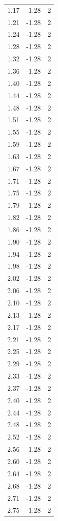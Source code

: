 \begin{longtable}{lrr}
  1.17 & -1.28 & 2 \\
  1.21 & -1.28 & 2 \\
  1.24 & -1.28 & 2 \\
  1.28 & -1.28 & 2 \\
  1.32 & -1.28 & 2 \\
  1.36 & -1.28 & 2 \\
  1.40 & -1.28 & 2 \\
  1.44 & -1.28 & 2 \\
  1.48 & -1.28 & 2 \\
  1.51 & -1.28 & 2 \\
  1.55 & -1.28 & 2 \\
  1.59 & -1.28 & 2 \\
  1.63 & -1.28 & 2 \\
  1.67 & -1.28 & 2 \\
  1.71 & -1.28 & 2 \\
  1.75 & -1.28 & 2 \\
  1.79 & -1.28 & 2 \\
  1.82 & -1.28 & 2 \\
  1.86 & -1.28 & 2 \\
  1.90 & -1.28 & 2 \\
  1.94 & -1.28 & 2 \\
  1.98 & -1.28 & 2 \\
  2.02 & -1.28 & 2 \\
  2.06 & -1.28 & 2 \\
  2.10 & -1.28 & 2 \\
  2.13 & -1.28 & 2 \\
  2.17 & -1.28 & 2 \\
  2.21 & -1.28 & 2 \\
  2.25 & -1.28 & 2 \\
  2.29 & -1.28 & 2 \\
  2.33 & -1.28 & 2 \\
  2.37 & -1.28 & 2 \\
  2.40 & -1.28 & 2 \\
  2.44 & -1.28 & 2 \\
  2.48 & -1.28 & 2 \\
  2.52 & -1.28 & 2 \\
  2.56 & -1.28 & 2 \\
  2.60 & -1.28 & 2 \\
  2.64 & -1.28 & 2 \\
  2.68 & -1.28 & 2 \\
  2.71 & -1.28 & 2 \\
  2.75 & -1.28 & 2 \\

\end{longtable}
